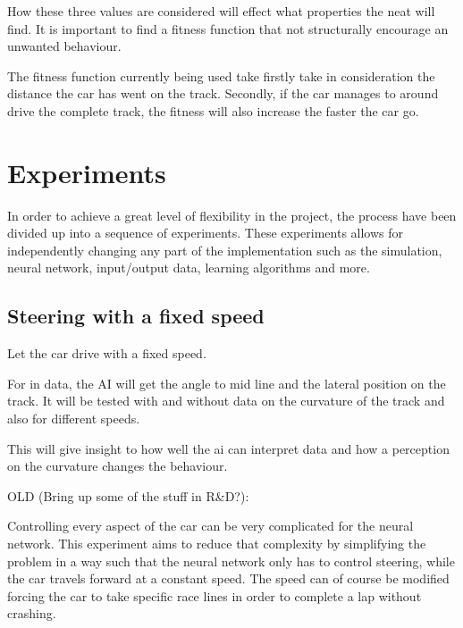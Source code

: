 How these three values are considered will effect what properties the neat will find. It is important to find a fitness function that not structurally encourage an unwanted behaviour.

The fitness function currently being used take firstly take in consideration the distance the car has went on the track. Secondly, if the car manages to around drive the complete track, the fitness will also increase the faster the car go.


\section{Experiments}
In order to achieve a great level of flexibility in the project, the process have been divided up into a sequence of experiments. These experiments allows for independently changing any part of the implementation such as the simulation, neural network, input/output data, learning algorithms and more.



\subsection{Steering with a fixed speed}
Let the car drive with a fixed speed. 

For in data, the AI will get the angle to mid line and the lateral position on the track. It will be tested with and without data on the curvature of the track and also for different speeds. 

This will give insight to how well the ai can interpret data and how a perception on the curvature changes the behaviour.


OLD (Bring up some of the stuff in R\&D?):

Controlling every aspect of the car can be very complicated for the neural network. This experiment aims to reduce that complexity by simplifying the problem in a way such that the neural network only has to control steering, while the car travels forward at a constant speed. The speed can of course be modified forcing the car to take specific race lines in order to complete a lap without crashing.

